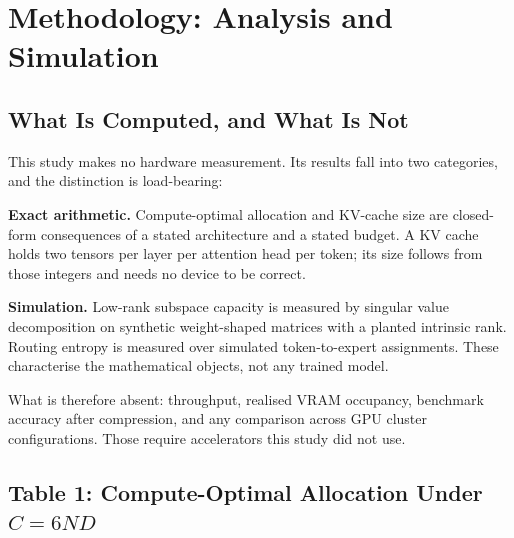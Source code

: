 \documentclass[10pt,journal,compsoc,twocolumn]{IEEEtran}
\begin{document}
\section{Methodology: Analysis and Simulation}



\subsection{What Is Computed, and What Is Not}


This study makes no hardware measurement. Its results fall into two categories, and the distinction is load-bearing:

\textbf{Exact arithmetic.} Compute-optimal allocation and KV-cache size are closed-form consequences of a stated architecture and a stated budget. A KV cache holds two tensors per layer per attention head per token; its size follows from those integers and needs no device to be correct.

\textbf{Simulation.} Low-rank subspace capacity is measured by singular value decomposition on synthetic weight-shaped matrices with a planted intrinsic rank. Routing entropy is measured over simulated token-to-expert assignments. These characterise the mathematical objects, not any trained model.

What is therefore absent: throughput, realised VRAM occupancy, benchmark accuracy after compression, and any comparison across GPU cluster configurations. Those require accelerators this study did not use.


\subsection{Table 1: Compute-Optimal Allocation Under $C = 6ND$}
\begin{table}[htbp]
\centering
{}
\end{table}
\end{document}
